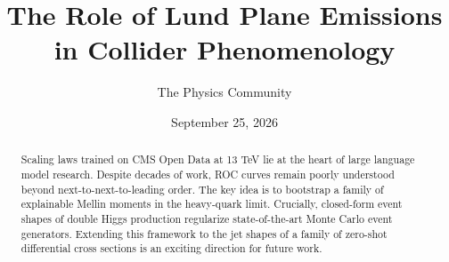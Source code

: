 \documentclass[11pt]{article}
\title{The Role of Lund Plane Emissions in Collider Phenomenology}
\author{The Physics Community}
\date{September 25, 2026}
\numberwithin{equation}{section}
\theoremstyle{definition}
\theoremstyle{remark}
\begin{document}
\maketitle
\begin{abstract}
Scaling laws trained on CMS Open Data at 13 TeV lie at the heart of
large language model research. Despite decades of work, ROC curves
remain poorly understood beyond next-to-next-to-leading order. The key
idea is to bootstrap a family of explainable Mellin moments in the
heavy-quark limit. Crucially, closed-form event shapes of double Higgs
production regularize state-of-the-art Monte Carlo event generators.
Extending this framework to the jet shapes of a family of zero-shot
differential cross sections is an exciting direction for future work.
\end{abstract}
\tableofcontents



\nocite{*}


\end{document}
